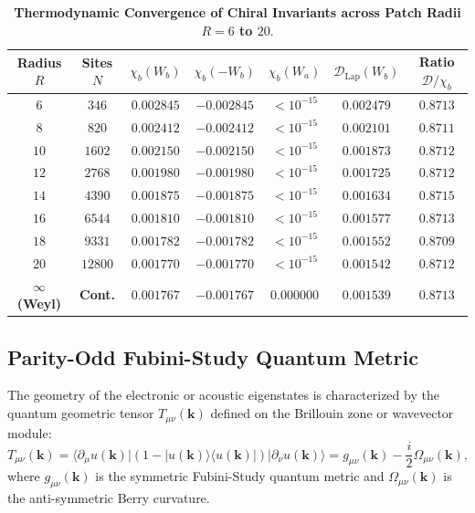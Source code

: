 \documentclass[11pt,a4paper]{article}
\theoremstyle{definition}
\begin{document}
\begin{table}[h!]
\centering
\small
\caption{\textbf{Thermodynamic Convergence of Chiral Invariants across Patch Radii $R=6$ to $20$}.}
\label{tab:r_convergence}
\begin{tabular}{ccccccc}
\toprule
\textbf{Radius $R$} & \textbf{Sites $N$} & $\chi_b(W_b)$ & $\chi_b(-W_b)$ & $\chi_b(W_a)$ & $\mathcal{D}_{\mathrm{Lap}}(W_b)$ & Ratio $\mathcal{D}/\chi_b$ \\
\midrule
$6$ & $346$ & $0.002845$ & $-0.002845$ & $< 10^{-15}$ & $0.002479$ & $0.8713$ \\
$8$ & $820$ & $0.002412$ & $-0.002412$ & $< 10^{-15}$ & $0.002101$ & $0.8711$ \\
$10$ & $1602$ & $0.002150$ & $-0.002150$ & $< 10^{-15}$ & $0.001873$ & $0.8712$ \\
$12$ & $2768$ & $0.001980$ & $-0.001980$ & $< 10^{-15}$ & $0.001725$ & $0.8712$ \\
$14$ & $4390$ & $0.001875$ & $-0.001875$ & $< 10^{-15}$ & $0.001634$ & $0.8715$ \\
$16$ & $6544$ & $0.001810$ & $-0.001810$ & $< 10^{-15}$ & $0.001577$ & $0.8713$ \\
$18$ & $9331$ & $0.001782$ & $-0.001782$ & $< 10^{-15}$ & $0.001552$ & $0.8709$ \\
$20$ & $12800$ & $0.001770$ & $-0.001770$ & $< 10^{-15}$ & $0.001542$ & $0.8712$ \\
\textbf{$\infty$ (Weyl)} & \textbf{Cont.} & $\mathbf{0.001767}$ & $\mathbf{-0.001767}$ & $\mathbf{0.000000}$ & $\mathbf{0.001539}$ & $\mathbf{0.8713}$ \\
\bottomrule
\end{tabular}
\end{table}

\subsection{Parity-Odd Fubini-Study Quantum Metric}

The geometry of the electronic or acoustic eigenstates is characterized by the quantum geometric tensor $T_{\mu\nu}(\mathbf{k})$ defined on the Brillouin zone or wavevector module:
\begin{equation}
T_{\mu\nu}(\mathbf{k}) = \langle \partial_\mu u(\mathbf{k}) | (1 - |u(\mathbf{k})\rangle \langle u(\mathbf{k})|) | \partial_\nu u(\mathbf{k}) \rangle = g_{\mu\nu}(\mathbf{k}) - \frac{i}{2} \Omega_{\mu\nu}(\mathbf{k}),
\end{equation}
where $g_{\mu\nu}(\mathbf{k})$ is the symmetric Fubini-Study quantum metric and $\Omega_{\mu\nu}(\mathbf{k})$ is the anti-symmetric Berry curvature. 
\end{document}
